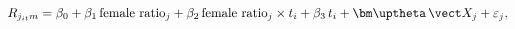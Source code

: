 \begin{equation}\label{equation14}
	R_{j_{it}m} =	\beta_0 + \beta_1\,\text{female ratio}_j + \beta_2\,\text{female ratio}_j\times t_i + \beta_3\,t_i + \bm\uptheta\,\vect X_j + \varepsilon_j,
\end{equation}